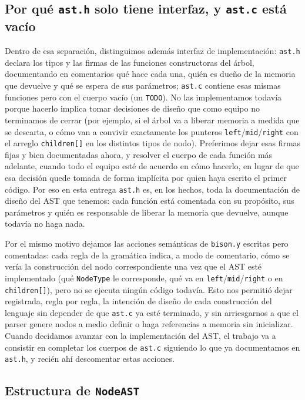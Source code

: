 \documentclass[11pt,a4paper]{article}
\begin{document}
\subsection{Por qué \texttt{ast.h} solo tiene interfaz, y \texttt{ast.c} está vacío}

Dentro de esa separación, distinguimos además interfaz de implementación:
\texttt{ast.h} declara los tipos y las firmas de las funciones constructoras
del árbol, documentando en comentarios qué hace cada una, quién es dueño de
la memoria que devuelve y qué se espera de sus parámetros; \texttt{ast.c}
contiene esas mismas funciones pero con el cuerpo vacío (un \texttt{TODO}).
No las implementamos todavía porque hacerlo implica tomar decisiones de
diseño que como equipo no terminamos de cerrar (por ejemplo, si el árbol va a
liberar memoria a medida que se descarta, o cómo van a convivir exactamente
los punteros \texttt{left}/\texttt{mid}/\texttt{right} con el arreglo
\texttt{children[]} en los distintos tipos de nodo). Preferimos dejar esas
firmas fijas y bien documentadas ahora, y resolver el cuerpo de cada función
más adelante, cuando todo el equipo esté de acuerdo en cómo hacerlo, en lugar
de que esa decisión quede tomada de forma implícita por quien haya escrito el
primer código. Por eso en esta entrega \texttt{ast.h} es, en los hechos, toda
la documentación de diseño del AST que tenemos: cada función está comentada
con su propósito, sus parámetros y quién es responsable de liberar la memoria
que devuelve, aunque todavía no haga nada.

Por el mismo motivo dejamos las acciones semánticas de \texttt{bison.y}
escritas pero comentadas: cada regla de la gramática indica, a modo de
comentario, cómo se vería la construcción del nodo correspondiente una vez
que el AST esté implementado (qué \texttt{NodeType} le corresponde, qué va en
\texttt{left}/\texttt{mid}/\texttt{right} o en \texttt{children[]}), pero no
se ejecuta ningún código todavía. Esto nos permitió dejar registrada, regla
por regla, la intención de diseño de cada construcción del lenguaje sin
depender de que \texttt{ast.c} ya esté terminado, y sin arriesgarnos a que el
parser genere nodos a medio definir o haga referencias a memoria sin
inicializar. Cuando decidamos avanzar con la implementación del AST, el
trabajo va a consistir en completar los cuerpos de \texttt{ast.c} siguiendo
lo que ya documentamos en \texttt{ast.h}, y recién ahí descomentar estas
acciones.

\subsection{Estructura de \texttt{NodeAST}}
\end{document}
